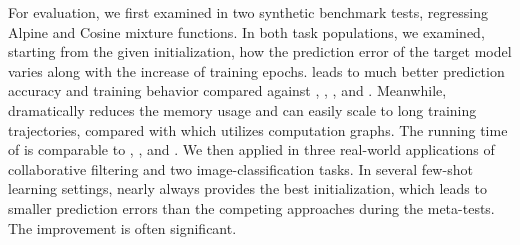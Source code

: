 For evaluation, we first examined \ours in two synthetic benchmark tests, regressing Alpine and Cosine mixture functions. In both task populations, we examined, starting from the given initialization, how the prediction error of the target model varies along with the increase of training epochs. \ours leads to much better prediction accuracy and training behavior compared against \maml, \fomaml, \rap, and \imaml.  Meanwhile, \ours dramatically reduces the memory usage and can easily scale to long training trajectories, compared with \maml which utilizes computation graphs.   The running time of \ours is comparable to \fomaml, \rap, and \imaml. We then applied \ours in three real-world applications of collaborative filtering and two image-classification tasks.  In several few-shot learning settings, \ours nearly always provides the best initialization, which leads to smaller prediction errors than the competing approaches during the meta-tests. The improvement is often significant. 

